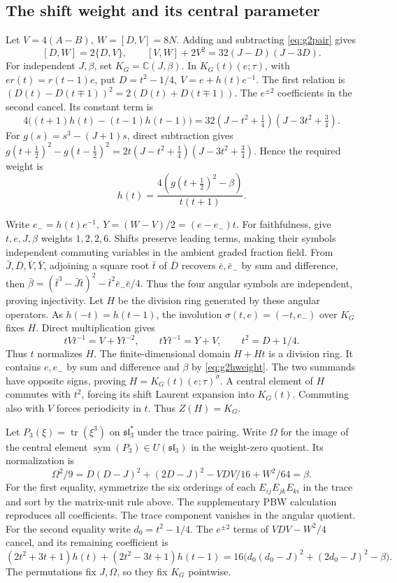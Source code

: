 \documentclass[11pt,a4paper]{article}
\theoremstyle{definition}
\begin{document}
\subsection{The shift weight and its central parameter}\label{sec:g2shift}
Let \(V=4(A-B),\ W=[D,V]=8N\). Adding and subtracting \eqref{eq:g2pair} gives
\[
 [D,W]=2\{D,V\},\qquad [V,W]+2V^2=32(J-D)(J-3D).
\]
For independent \(J,\beta\), set \(K_G=\mathbb C(J,\beta)\). In \(K_G(t)(e;\tau)\), with \(e r(t)=r(t-1)e\), put \(D=t^2-1/4,\ V=e+h(t)e^{-1}\). The first relation is
\((D(t)-D(t\mp1))^2=2(D(t)+D(t\mp1))\). The \(e^{\pm2}\) coefficients in the second cancel. Its constant term is
\[
 4\big((t+1)h(t)-(t-1)h(t-1)\big)
 =32(J-t^2+\tfrac14)(J-3t^2+\tfrac34).
\]
For \(g(s)=s^3-(J+1)s\), direct subtraction gives
\(
 g(t+\tfrac12)^2-g(t-\tfrac12)^2
 =2t(J-t^2+\tfrac14)(J-3t^2+\tfrac34)
\).
Hence the required weight is
\begin{equation}\label{eq:g2hweight}
 h(t)=\frac{4(g(t+\tfrac12)^2-\beta)}{t(t+1)} .
\end{equation}

Write \(e_-=h(t)e^{-1},\ Y=(W-V)/2=(e-e_-)t\). For faithfulness, give \(t,e,J,\beta\) weights \(1,2,2,6\). Shifts preserve leading terms, making their symbols independent commuting variables in the ambient graded fraction field. From \(\bar J,\bar D,\bar V,\bar Y\), adjoining a square root \(\bar t\) of \(\bar D\) recovers \(\bar e,\bar e_-\) by sum and difference, then
\(
 \bar\beta=(\bar t^3-\bar J\bar t)^2-\bar t^2\bar e_-\bar e/4 .
\)
Thus the four angular symbols are independent, proving injectivity. Let \(H\) be the division ring generated by these angular operators. As \(h(-t)=h(t-1)\), the involution \(\sigma(t,e)=(-t,e_-)\) over \(K_G\) fixes \(H\). Direct multiplication gives
\[
 tVt^{-1}=V+Yt^{-2},\qquad tYt^{-1}=Y+V,\qquad t^2=D+1/4 .
\]
Thus \(t\) normalizes \(H\). The finite-dimensional domain \(H+Ht\) is a division ring. It contains \(e,e_-\) by sum and difference and \(\beta\) by \eqref{eq:g2hweight}. The two summands have opposite signs, proving \(H=K_G(t)(e;\tau)^\sigma\). A central element of \(H\) commutes with \(t^2\), forcing its shift Laurent expansion into \(K_G(t)\). Commuting also with \(V\) forces periodicity in \(t\). Thus \(Z(H)=K_G\).

Let \(P_3(\xi)=\operatorname{tr}(\xi^3)\) on \(\mathfrak{sl}_3^*\) under the trace pairing. Write \(\Omega\) for the image of the central element \(\operatorname{sym}(P_3)\in U(\mathfrak{sl}_3)\) in the weight-zero quotient. Its normalization is
\begin{equation}\label{eq:beta}
 \Omega^2/9=D(D-J)^2+(2D-J)^2-VDV/16+W^2/64=\beta .
\end{equation}
For the first equality, symmetrize the six orderings of each \(E_{ij}E_{jk}E_{ki}\) in the trace and sort by the matrix-unit rule above. The supplementary PBW calculation reproduces all coefficients. The trace component vanishes in the angular quotient. For the second equality write \(d_0=t^2-1/4\). The \(e^{\pm2}\) terms of \(VDV-W^2/4\) cancel, and its remaining coefficient is
\[
 (2t^2+3t+1)h(t)+(2t^2-3t+1)h(t-1)
 =16\big(d_0(d_0-J)^2+(2d_0-J)^2-\beta\big).
\]
The permutations fix \(J,\Omega\), so they fix \(K_G\) pointwise.
\end{document}
